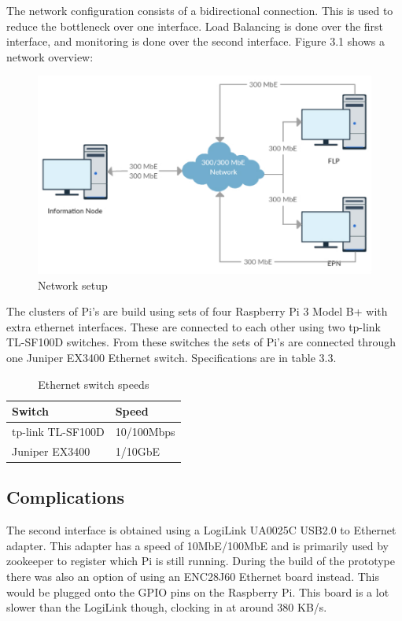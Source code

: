 The network configuration consists of a bidirectional connection. This is used to reduce the bottleneck over one interface. Load Balancing is done over the first interface, and monitoring is done over the second interface. Figure 3.1 shows a network overview:
\begin{figure}[htb]
    \centering
    \includegraphics[scale=0.5]{./graphics/Network_thesis.pdf}
    \caption{Network setup}
\end{figure}

The clusters of Pi's are build using sets of four Raspberry Pi 3 Model B+ with extra ethernet interfaces. These are connected to each other using two tp-link TL-SF100D switches. From these switches the sets of Pi's are connected through one Juniper EX3400 Ethernet switch. Specifications are in table 3.3.

\begin{table}[htb]
\begin{tabular}{| l | l |}
\hline
Switch & Speed \\ \hline
tp-link TL-SF100D & 10/100Mbps \\ \hline
Juniper EX3400 & 1/10GbE \\
\hline
\end{tabular}
\caption{Ethernet switch speeds}
\end{table}

\subsection{Complications}
The second interface is obtained using a LogiLink UA0025C USB2.0 to Ethernet adapter. This adapter has a speed of 10MbE/100MbE and is primarily used by zookeeper to register which Pi is still running. During the build of the prototype there was also an option of using an ENC28J60 Ethernet board instead. This would be plugged onto the GPIO pins on the Raspberry Pi. This board is a lot slower than the LogiLink though, clocking in at around 380 KB/s. 

